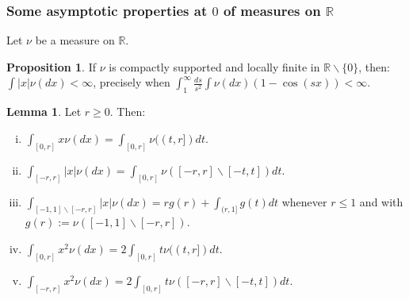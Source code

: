 \documentclass[pdftex,oneside,11pt,reqno]{amsart}
\theoremstyle{definition}
\theoremstyle{theorem}
\newtheorem{proposition}{Proposition}[section]
\newtheorem{lemma}{Lemma}[section]
\theoremstyle{remark}
\numberwithin{equation}{section}
\numberwithin{definition}{section}
\begin{document}
\subsubsection{Some asymptotic properties at $0$ of measures on $\mathbb{R}$}\label{subsection:some_asymptotic_properties_at_zero}

Let $\nu$ be a measure on $\mathbb{R}$. 
\begin{proposition}\label{appendix:proposition:integrability:main}
If $\nu$ is compactly supported and locally finite in $\mathbb{R}\backslash \{0\}$, then: $\int\vert x\vert \nu(dx)<\infty$, precisely when $\int_1^\infty \frac{ds}{s^2}\int \nu(dx)(1-\cos(sx))<\infty.$
\end{proposition}

\begin{lemma}\label{lemma:fubini}
Let $r\geq 0$. Then:
\begin{enumerate}[(i)]
\item\label{fubini:one} $\int_{[0,r]} x \nu(dx)=\int_{[0,r]}\nu((t,r])dt$.
\item\label{fubini:two} $\int_{[-r,r]}\vert x\vert \nu(dx)=\int_{[0,r]}\nu([-r,r]\backslash [-t,t])dt$.
\item\label{fubini:three} $\int_{[-1,1]\backslash [-r,r]}\vert x\vert \nu(dx)=rg(r)+\int_{(r,1]}g(t)dt$ whenever $r\leq 1$ and with $g(r):=\nu([-1,1]\backslash [-r,r])$.
\item\label{fubini:four} $\int_{[0,r]}x^2\nu(dx)=2\int_{[0,r]}t\nu((t,r])dt$.
\item\label{fubini:five} $\int_{[-r,r]}x^2\nu(dx)=2\int_{[0,r]}t\nu([-r,r]\backslash [-t,t])dt$.
\end{enumerate}
\end{lemma}
\end{document}
